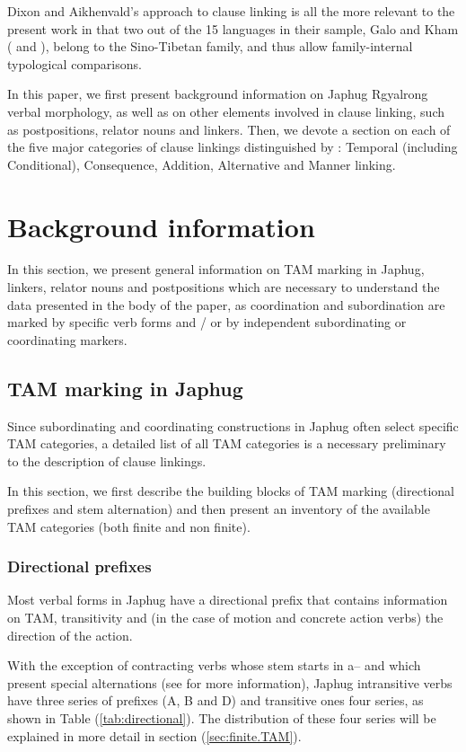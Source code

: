 \documentclass[oldfontcommands,oneside,a4paper,11pt]{article}
\newcommand{\ipa}[1]{{\phon \mbox{#1}}} %
\newcommand{\refb}[1]{(\ref{#1})}
\begin{document}
Dixon and Aikhenvald's approach to clause linking is all the more relevant to the present work in that two out of the 15 languages in their sample, Galo and Kham (\citealt{post09linking} and \citealt{watters09kham}), belong to the Sino-Tibetan family, and thus allow family-internal typological comparisons.

In this paper, we first present background information on Japhug Rgyalrong verbal morphology, as well as on other elements involved in clause linking, such as postpositions, relator nouns and linkers. Then, we devote a section on each of the five major categories of clause linkings distinguished by  \citet{dixon09intro}: Temporal (including Conditional), Consequence, Addition, Alternative and Manner linking. 

\section{Background information}
In this section, we present general information on TAM marking in Japhug, linkers, relator nouns and postpositions which are necessary to understand the data presented in the body of the paper, as coordination and subordination are marked   by specific verb forms and / or by independent subordinating or coordinating markers.
 

\subsection{TAM marking in Japhug}
Since subordinating and coordinating constructions in Japhug often select specific TAM categories, a detailed list of all TAM categories is a necessary preliminary to the description of clause linkings. 

In this section, we first  describe the building blocks of TAM marking (directional prefixes and stem alternation) and then present an inventory of the available TAM categories (both finite and non finite).

\subsubsection{Directional prefixes} \label{sec:directional}
Most verbal forms in Japhug have a directional prefix that contains information on TAM, transitivity and  (in the case of motion and concrete action verbs) the direction of the action.

With the exception of contracting verbs whose stem starts in \ipa{a--} and which present special alternations (see \citealt{jacques07passif} for more information), Japhug intransitive verbs have three series of prefixes (A, B and D) and transitive ones four series, as shown in Table \refb{tab:directional}. The distribution of these four series will be explained in more detail in section \refb{sec:finite.TAM}.
\end{document}
